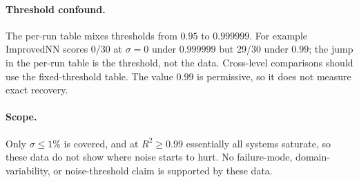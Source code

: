 \documentclass[twoside,11pt]{article}
\newcommand{\Rsq}{R^{2}}
\begin{document}
\paragraph{Threshold confound.} The per-run table mixes thresholds from $0.95$ to
$0.999999$. For example ImprovedNN scores 0/30 at $\sigma=0$ under $0.999999$ but
29/30 under $0.99$; the jump in the per-run table is the threshold, not the
data. Cross-level comparisons should use the fixed-threshold table. The value
$0.99$ is permissive, so it does not measure exact recovery.

\paragraph{Scope.} Only $\sigma\leq1\%$ is covered, and at
$\Rsq\geq0.99$ essentially all systems saturate, so these data do not show where
noise starts to hurt. No failure-mode, domain-variability, or noise-threshold claim is supported by
these data.

\end{document}
